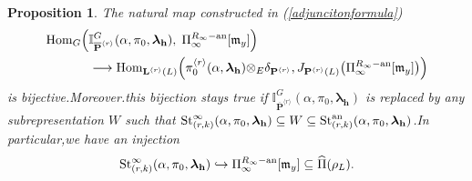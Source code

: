 \documentclass[SecEq,CM,GP]{degruyter-crelle} %
\theoremstyle{plain}
\newtheorem{pro}[thm]{Proposition}
\newcommand{\ana}{{\rm an}}
\newcommand{\homo}{{\rm Hom}}
\newcommand{\lrr}{{\langle r\rangle}}
\newcommand{\lra}{\longrightarrow}
\newcommand{\op}{{\overline{{\mathbf{P}}}}}
\newcommand{\st}{{\rm St}}
\newcommand{\te}{{\otimes_E}}
\newcommand{\BI}{{\mathbb{I}}}
\newcommand{\bL}{{\mathbf{L}}}
\newcommand{\bP}{{\mathbf{P}}}
\newcommand{\bh}{{\mathbf{h}}}
\newcommand{\fm}{{\mathfrak{m}}}
\begin{document}
\begin{pro}\label{proadjuncitonformularight}
The natural map constructed in (\ref{adjuncitonformula})
\begin{equation}\label{adjuncitonformularight}
	\begin{aligned}
		\homo_{G}\Big(&\BI_{\op^{\lrr}}^G(\alpha,\pi_0,{\bm\lambda}_\bh),\; \Pi_{\infty}^{R_{\infty}-\ana}[\fm_y]\Big)\\
		&\lra \homo_{\bL^{\lrr}(L)}\Big(\pi_0^{\lrr}(\alpha,{\bm\lambda}_\bh)\te \delta_{\bP^{\lrr}}, J_{\bP^{\lrr}(L)}\big(\Pi_{\infty}^{R_{\infty}-\ana}[\fm_y]\big)\Big)
	\end{aligned}
\end{equation}
is bijective.\;Moreover.\;this bijection stays true if \;$\BI_{\op^{\lrr}}^G(\alpha,\pi_0,{\bm\lambda}_\bh)$ is replaced by any subrepresentation $W$ such that $\st^{\infty}_{(r,k)}(\alpha,\pi_0,{\bm\lambda}_\bh)\subseteq W \subseteq \st^{\ana}_{(r,k)}(\alpha,\pi_0,{\bm\lambda}_\bh)$.\;In particular,\;we have an injection
\begin{equation}\label{steinberginj}
	\st_{(r,k)}^{\infty}(\alpha,\pi_0, {\bm\lambda}_\bh)\hookrightarrow\Pi_{\infty}^{R_{\infty}-\ana}[\fm_y]\subseteq\widehat{\Pi}(\rho_L).
\end{equation}
\end{pro}
\end{document}
